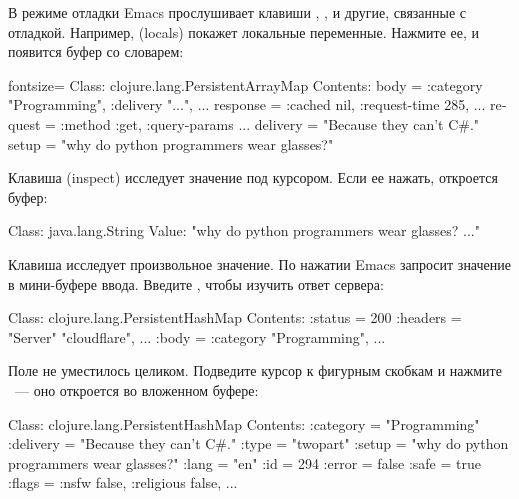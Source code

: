 В режиме отладки Emacs прослушивает клавиши , ,  и другие, связанные с отладкой. Например,  (locals) покажет локальные переменные. Нажмите ее, и появится буфер со словарем:

\begin{english}
  \begin{clojure*}{fontsize=\small}
Class: clojure.lang.PersistentArrayMap
Contents:
  body = { :category "Programming", :delivery "...",  ... }
  response = { :cached nil, :request-time 285,  ... }
  request = { :method :get, :query-params ... }
  delivery = "Because they can't C#."
  setup = "why do python programmers wear glasses?"
  \end{clojure*}
\end{english}

Клавиша  (inspect) исследует значение под курсором. Если ее нажать, откроется буфер:

\begin{english}
  \begin{text}
Class: java.lang.String
Value: "why do python programmers wear glasses? ..."
  \end{text}
\end{english}

Клавиша  исследует произвольное значение. По нажатии Emacs запросит значение в мини-буфере ввода. Введите , чтобы изучить ответ сервера:

\begin{english}
  \begin{clojure}
Class: clojure.lang.PersistentHashMap
Contents:
  :status = 200
  :headers = { "Server" "cloudflare", ... }
  :body = { :category "Programming",  ... }
  \end{clojure}
\end{english}

Поле  не уместилось целиком. Подведите курсор к фигурным скобкам и нажмите \enter~--- оно откроется во вложенном буфере:

\begin{english}
  \begin{clojure}
Class: clojure.lang.PersistentHashMap
Contents:
  :category = "Programming"
  :delivery = "Because they can't C#."
  :type = "twopart"
  :setup = "why do python programmers wear glasses?"
  :lang = "en"
  :id = 294
  :error = false
  :safe = true
  :flags = { :nsfw false, :religious false, ... }
  \end{clojure}
\end{english}

